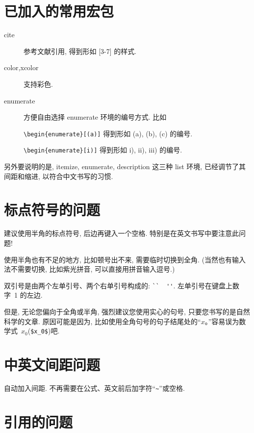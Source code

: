 \documentclass{WHUMaster}   %
\begin{document}
\section{已加入的常用宏包}

\begin{description}
  \item[cite]  参考文献引用, 得到形如 [3-7] 的样式.
  \item[color,xcolor]  支持彩色.
  \item[enumerate]  方便自由选择 enumerate 环境的编号方式. 比如

  \verb|\begin{enumerate}[(a)]| 得到形如 (a), (b), (c) 的编号.

  \verb|\begin{enumerate}[i)]| 得到形如 i), ii), iii) 的编号.

\end{description}

另外要说明的是,  itemize, enumerate, description 这三种 list 环境, 已经调节了其间距和缩进,
以符合中文书写的习惯.

\section{标点符号的问题}

建议使用半角的标点符号, 后边再键入一个空格. 特别是在英文书写中要注意此问题!

使用半角也有不足的地方, 比如顿号出不来, 需要临时切换到全角. (当然也有输入法不需要切换, 比如紫光拼音, 可以直接用拼音输入逗号.)

双引号是由两个左单引号、两个右单引号构成的: \verb|``  ''|. 左单引号在键盘上数字~1 的左边.

但是, 无论您偏向于全角或半角, 强烈建议您使用实心的句号, 只要您书写的是自然科学的文章.
原因可能是因为, 比如使用全角句号的句子结尾处的``$x$。''容易误为数学式~$x_0$(\verb|$x_0$|)吧.

\section{中英文间距问题}

自动加入间距. 不再需要在公式、英文前后加字符``\verb|~|''或空格.

\section{引用的问题}
\end{document}
